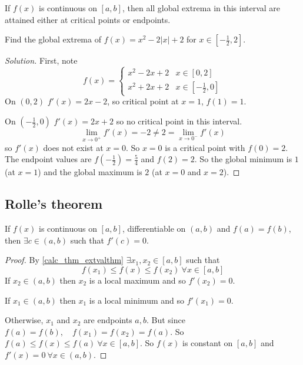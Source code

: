 \documentclass[10pt, a4paper]{article}
\begin{document}
If $f(x)$ is continuous on $[a, b]$,
then all global extrema in this interval are attained either at critical points or endpoints.

\begin{example}
    Find the global extrema of $f(x) = x ^ 2 - 2|x| + 2$ for $x \in \left[-\frac{1}{2}, 2\right]$.
    \begin{proof}[Solution]\renewcommand{\qedsymbol}{}
        First, note
        \[
        f(x) = \begin{cases}
            x ^ 2 - 2x + 2 & x \in [0, 2] \\
            x ^ 2 + 2x + 2 & x \in \left[-\frac{1}{2}, 0\right]
        \end{cases}
        \]
        On $(0, 2)$ $f'(x) = 2x - 2$,
        so critical point at $x = 1$, $f(1) = 1$.

        On $\left(-\frac{1}{2}, 0\right)$ $f'(x) = 2x + 2$ so no critical point in this interval.
        \[
        \lim_{x \rightarrow 0^{+}}f'(x) = -2 \neq 2 = \lim_{x \rightarrow 0^{-}}f'(x)
        \]
        so $f'(x)$ does not exist at $x = 0$.
        So $x = 0$ is a critical point with $f(0) = 2$.
        The endpoint values are $f\left(-\frac{1}{2}\right) = \frac{5}{4}$ and $f(2) = 2$.
        So the global minimum is $1$ (at $x = 1$) and the global maximum is $2$ (at $x = 0$ and $x = 2$).
    \end{proof}
\end{example}

\subsection{Rolle's theorem}

\begin{theorem}\label{calc_thm_rolle}
    If $f(x)$ is continuous on $[a, b]$, differentiable on $(a, b)$ and $f(a) = f(b)$, then $\exists c \in (a, b)$ such that $f'(c) = 0$.
    \begin{proof}
        By \autoref{calc_thm_extvalthm} $\exists x_1, x_2 \in [a, b]$ such that
        \[
        f(x_1) \leq f(x) \leq f(x_2)\ \forall x \in [a, b]
        \]
        If $x_2 \in (a, b)$ then $x_2$ is a local maximum and so $f'(x_2) = 0$.

        If $x_1 \in (a, b)$ then $x_1$ is a local minimum and so $f'(x_1) = 0$.

        Otherwise, $x_1$ and $x_2$ are endpoints $a, b$.
        But since $f(a) = f(b),\quad f(x_1) = f(x_2) = f(a)$.
        So $f(a) \leq f(x) \leq f(a)\ \forall x \in [a, b]$.
        So $f(x)$ is constant on $[a, b]$ and $f'(x) = 0\ \forall x \in (a, b)$.
    \end{proof}
\end{theorem}
\end{document}
